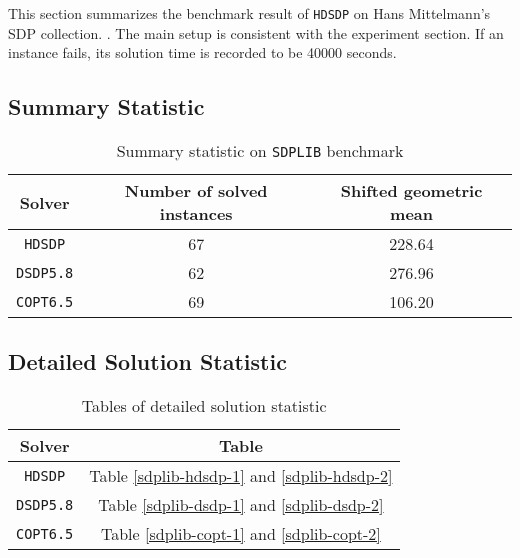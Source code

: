 This section summarizes the benchmark result of \texttt{HDSDP} on Hans Mittelmann's SDP collection. \cite{mittelmann2003independent}. The main setup is consistent with the experiment section. If an instance fails, its solution time is recorded to be 40000 seconds.

\subsection{Summary Statistic}

\begin{table}[H]
\caption{Summary statistic on \texttt{SDPLIB} benchmark}
  \begin{tabular}{ccc}
  \toprule
  Solver & Number of solved instances & Shifted geometric mean \\
  \midrule
  \texttt{HDSDP} & 67 & 228.64 \\
    \texttt{DSDP5.8} & 62 & 276.96 \\
    \texttt{COPT6.5} & 69 & 106.20 \\
  	\bottomrule
  \end{tabular}	
\end{table}

\subsection{Detailed Solution Statistic}
\begin{table}[H]
\caption{Tables of detailed solution statistic}
  \begin{tabular}{cc}
  \toprule
  Solver & Table \\
  \midrule
   \texttt{HDSDP} & Table \ref{sdplib-hdsdp-1} and  \ref{sdplib-hdsdp-2}   \\
    \texttt{DSDP5.8} & Table \ref{sdplib-dsdp-1} and  \ref{sdplib-dsdp-2} \\
    \texttt{COPT6.5} & Table \ref{sdplib-copt-1} and  \ref{sdplib-copt-2} \\
  	\bottomrule
  \end{tabular}	
\end{table}

